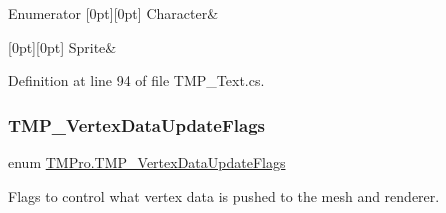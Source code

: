 \begin{DoxyEnumFields}{Enumerator}
[0pt][0pt]{}\mbox{\label{namespace_t_m_pro_ab5662f47179bf1b81c575ecf80b24065a76a40e4f974fd895a0a2598c1cee28b4}} 
Character&\\
\hline

[0pt][0pt]{}\mbox{\label{namespace_t_m_pro_ab5662f47179bf1b81c575ecf80b24065a51f2b7b14433aa22c67d1f4fc18943cd}} 
Sprite&\\
\hline

\end{DoxyEnumFields}


Definition at line 94 of file T\+M\+P\+\_\+\+Text.\+cs.

\mbox{\label{namespace_t_m_pro_a517464fab2ef7ff5b9658d2acaf49a57}} 
\subsubsection{\texorpdfstring{TMP\_VertexDataUpdateFlags}{TMP\_VertexDataUpdateFlags}}
{\footnotesize\ttfamily enum \mbox{\hyperlink{namespace_t_m_pro_a517464fab2ef7ff5b9658d2acaf49a57}{T\+M\+Pro.\+T\+M\+P\+\_\+\+Vertex\+Data\+Update\+Flags}}\hspace{0.3cm}{\ttfamily [strong]}}



Flags to control what vertex data is pushed to the mesh and renderer. 

